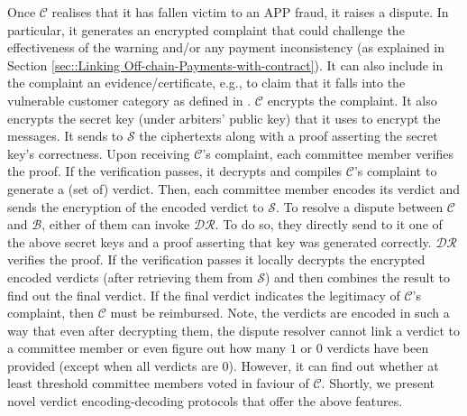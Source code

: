 

Once $\mathcal{C}$ realises that it has fallen victim to an APP fraud, it  raises a dispute. In particular, it  generates  an encrypted complaint that could  challenge the effectiveness of the warning and/or any payment inconsistency (as explained in Section \ref{sec::Linking Off-chain-Payments-with-contract}). It can also  include in the complaint an  evidence/certificate, e.g., to claim that it falls into  the vulnerable customer category as defined in \cite{CRM-code}. $\mathcal{C}$ encrypts the complaint. It also   encrypts the secret key (under arbiters' public key) that it uses to encrypt the messages. It sends to $\mathcal{S}$ the ciphertexts along with a proof asserting the secret key's correctness.  Upon receiving $\mathcal{C}$'s complaint, each committee member verifies the proof. If the verification passes, it decrypts and compiles $\mathcal{C}$'s complaint to generate a (set of) verdict. Then, each committee member encodes its verdict and sends the  encryption of the encoded verdict to $\mathcal{S}$. To resolve a dispute between $\mathcal{C}$ and $\mathcal{B}$, either of them can  invoke $\mathcal{DR}$. To do so, they  directly send to it one of the above secret keys and a proof asserting that key was generated correctly.   $\mathcal{DR}$ verifies the proof. If the verification passes it locally decrypts the encrypted encoded verdicts (after retrieving them from $\mathcal{S}$) and then combines the result to find out the final verdict.  If the final verdict indicates the legitimacy of  $\mathcal{C}$'s complaint, then $\mathcal{C}$ must be reimbursed.   Note, the verdicts are encoded in such a way that even after decrypting them, the dispute resolver cannot link a verdict to a committee member or even figure out how many $1$ or $0$ verdicts have been provided  (except when all verdicts are $0$). However, it can find out whether at least threshold committee members voted  in faviour of $\mathcal{C}$. Shortly, we present  novel verdict encoding-decoding protocols that offer the above features. 





